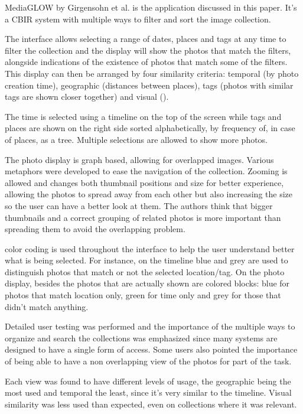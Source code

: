 MediaGLOW by Girgensohn et al. \cite{Girgensohn:2010} is the application discussed in this paper. It's a \ac{CBIR} system with multiple ways to filter and sort the image collection.

The interface allows selecting a range of dates, places and tags at any time to filter the collection and the display will show the photos that match the filters, alongside indications of the existence of photos that match some of the filters. This display can then be arranged by four similarity criteria: temporal (by photo creation time), geographic (distances between places), tags (photos with similar tags are shown closer together) and visual ().

The time is selected using a timeline on the top of the screen while tags and places are shown on the right side sorted alphabetically, by frequency of, in case of places, as a tree. Multiple selections are allowed to show more photos.

The photo display is graph based, allowing for overlapped images. Various metaphors were developed to ease the navigation of the collection. Zooming is allowed and changes both thumbnail positions and size for better experience, allowing the photos to spread away from each other but also increasing the size so the user can have a better look at them. The authors think that bigger thumbnails and a correct grouping of related photos is more important than spreading them to avoid the overlapping problem.

color coding is used throughout the interface to help the user understand better what is being selected. For instance, on the timeline blue and grey are used to distinguish photos that match or not the selected location/tag. On the photo display, besides the photos that are actually shown are colored blocks: blue for photos that match location only, green for time only and grey for those that didn't match anything.

Detailed user testing was performed and the importance of the multiple ways to organize and search the collections was emphasized since many systems are designed to have a single form of access. Some users also pointed the importance of being able to have a non overlapping view of the photos for part of the task.

Each view was found to have different levels of usage, the geographic being the most used and temporal the least, since it's very similar to the timeline. Visual similarity was less used than expected, even on collections where it was relevant. 











